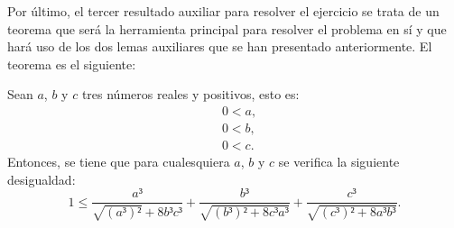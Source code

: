 Por último, el tercer resultado auxiliar para resolver el ejercicio
se trata de un teorema que será la herramienta principal para
resolver el problema en sí y que hará uso de los dos lemas auxiliares
que se han presentado anteriormente. El teorema es el siguiente:
\begin{teorema}\label{teoremaaux}
  Sean \(a\), \(b\) y \(c\) tres números reales y positivos, esto es:
  \begin{align}
    &0<a, \label{haq2t}\tag{ha}\\
    &0<b, \label{hbq2t}\tag{hb}\\
    &0<c. \label{hcq2t}\tag{hc}
  \end{align}
  Entonces, se tiene que para cualesquiera \(a\), \(b\) y \(c\) se
  verifica la siguiente desigualdad:
  \begin{equation}\label{eqteorema}
    1≤\frac{a³}{\sqrt{(a³)²}+8b³c³}+\frac{b³}{\sqrt{(b³)²+8c³a³}}+
    \frac{c³}{\sqrt{(c³)²+8a³b³}}.
  \end{equation}
\end{teorema}

